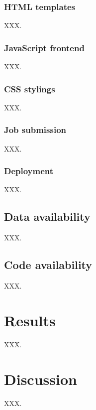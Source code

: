 \subsubsection{HTML templates}

XXX.

\subsubsection{JavaScript frontend}

XXX.

\subsubsection{CSS stylings}

XXX.

\subsubsection{Job submission}

XXX.

\subsubsection{Deployment}

XXX.

\subsection{Data availability}

XXX.

\subsection{Code availability}

XXX.

\section{Results}

XXX.

\section{Discussion}

XXX.